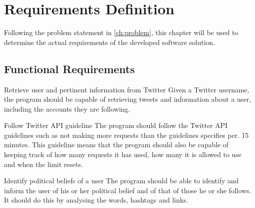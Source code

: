 \chapter{Requirements Definition}\label{cha:req}
Following the problem statement in \autoref{ch:problem}, this chapter will be
used to determine the actual requirements of the developed software solution.


\section{Functional Requirements}

\begin{requirement}{Retrieve user and pertinent information from Twitter}
Given a Twitter username, the program should be capable of retrieving
tweets and information about a user, including the accounts they are following.
\end{requirement}

\begin{requirement}{Follow Twitter \ac{API} guideline} 
The program should follow the Twitter \ac{API} guidelines such as not making
more requests than the guidelines specifies per. 15 minutes. This guideline
means that the program should also be capable of keeping track of how many
requests it has used, how many it is allowed to use and when the limit resets. 
\end{requirement}

\begin{requirement}{Identify political beliefs of a user}
The program should be able to identify and inform the user of his or her
political belief and of that of those he or she follows. It should do this by
analysing the words, hashtags and links.

\end{requirement}

